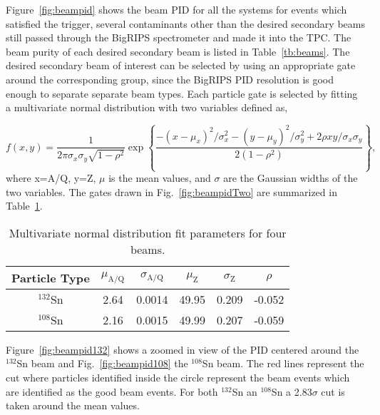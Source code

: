 Figure~\ref{fig:beampid} shows the beam PID for all the systems for events which satisfied the trigger, several contaminants other than the desired secondary beams still passed through the BigRIPS spectrometer and made it into the TPC. The beam purity of each desired secondary beam is listed in Table~\ref{tb:beams}. The desired secondary beam of interest can be selected by using an appropriate gate around the corresponding group, since the BigRIPS PID resolution is good enough to separate separate beam types. Each particle gate is selected by fitting a multivariate normal distribution with two variables defined as,

\begin{equation}
  f(x,y)=\frac1{2\pi\sigma_x\sigma_y\sqrt{1-\rho^2}}\exp\left\{
  \frac{-(x - \mu_{x})^2/\sigma_x^2-(y-\mu_{y})^2/\sigma_y^2+2\rho
  xy/\sigma_x\sigma_y}{2(1-\rho^2)}\right\},
   \label{multiGauss}
\end{equation}
where x=A/Q, y=Z, $\mu$ is the mean values, and $\sigma$ are the Gaussian widths of the two variables. The gates drawn in Fig.~\ref{fig:beampidTwo} are summarized in Table~\ref{beamParameters}. 

\begin{table}[H]
  \begin{center}
    \begin{tabular}{cccccc}
      \hline 
      Particle Type & $\mu_\mathrm{A/Q}$ & $\sigma_\mathrm{A/Q}$ & $\mu_\mathrm{Z}$ &
      $\sigma_\mathrm{Z}$ & $\rho$\\
      \hline\hline 
      ${}^{132}$Sn & 2.64 & 0.0014 & 49.95 & 0.209 & -0.052 \\
      ${}^{108}$Sn & 2.16 & 0.0015 & 49.99 & 0.207 & -0.059 \\
      \hline
    \end{tabular}
    \caption{Multivariate normal distribution fit parameters for four beams.
    \label{beamParameters}}
  \end{center}
\end{table}
Figure~\ref{fig:beampid132} shows a zoomed in view of the PID centered around the ${}^{132}$Sn beam and Fig.~\ref{fig:beampid108} the ${}^{108}$Sn beam. The red lines represent the cut where particles identified inside the circle represent the beam events which are identified as the good beam events. For both ${}^{132}$Sn an ${}^{108}$Sn a 2.83$\sigma$ cut is taken around the mean values.  


